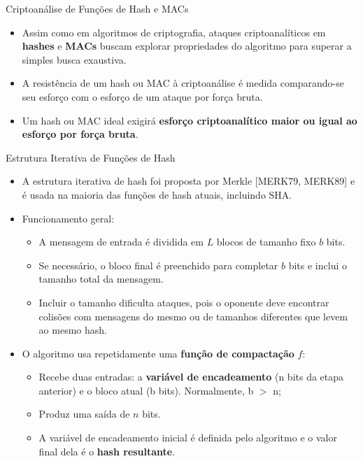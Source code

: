 \begin{frame}{Criptoanálise de Funções de Hash e MACs}
    \begin{itemize}
        \item Assim como em algoritmos de criptografia, ataques criptoanalíticos em \textbf{hashes} e \textbf{MACs} buscam explorar propriedades do algoritmo para superar a simples busca exaustiva.
        \item A resistência de um hash ou MAC à criptoanálise é medida comparando-se seu esforço com o esforço de um ataque por força bruta.
        \item Um hash ou MAC ideal exigirá \textbf{esforço criptoanalítico maior ou igual ao esforço por força bruta}.
    \end{itemize}
\end{frame}
\begin{frame}{Estrutura Iterativa de Funções de Hash}
    \begin{itemize}
        \item A estrutura iterativa de hash foi proposta por Merkle [MERK79, MERK89] e é usada na maioria das funções de hash atuais, incluindo SHA.
        \item Funcionamento geral:
              \begin{itemize}
                  \item A mensagem de entrada é dividida em $L$ blocos de tamanho fixo $b$ bits.
                  \item Se necessário, o bloco final é preenchido para completar $b$ bits e inclui o tamanho total da mensagem.
                  \item Incluir o tamanho dificulta ataques, pois o oponente deve encontrar colisões com mensagens do mesmo ou de tamanhos diferentes que levem ao mesmo hash.
              \end{itemize}
        \item O algoritmo usa repetidamente uma \textbf{função de compactação} $f$:
              \begin{itemize}
                  \item Recebe duas entradas: a \textbf{variável de encadeamento} (n bits da etapa anterior) e o bloco atual (b bits). Normalmente, b $>$ n;
                  \item Produz uma saída de $n$ bits.
                  \item A variável de encadeamento inicial é definida pelo algoritmo e o valor final dela é o \textbf{hash resultante}.
              \end{itemize}
    \end{itemize}
\end{frame}

